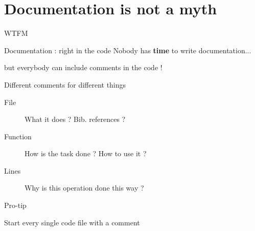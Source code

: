 \documentclass[10pt]{beamer}
\begin{document}

\section{Documentation is not a myth} %

\begin{frame}{WTFM} %
  \begin{center}
  \end{center}

\end{frame}

\begin{frame}{Documentation : right in the code} %
  Nobody has \textbf{time} to write documentation...

  but everybody can include comments in the code !

  \pause
  \medskip

  \begin{block}{Different comments for different things}
    \begin{description}
    \item[File] What it does ? Bib. references ?
    \item[Function] How is the task done ? How to use it ?
    \item[Lines] Why is this operation done this way ?
    \end{description}
  \end{block}

  \pause
  \medskip

  \begin{block}{Pro-tip}
    \begin{center}
      Start every single code file with a comment
    \end{center}
  \end{block}

\end{frame}
\end{document}
